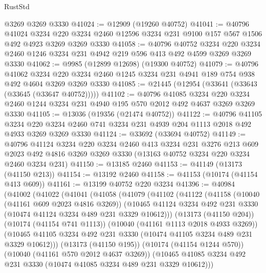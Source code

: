 \begin{lexlean}{RustStd}
\begin{coremodule}
    @3269
    @3269
    @3330
@41024 := @12909 (@19260 @40752)
@41041 := @40796
    @41024
    @3234
    @220
    @3234
    @2460
    @12596
    @3234
    @231
    @9100
    @157
    @567
    @1506
    @492
    @4923
    @3269
    @3269
    @3330
@41058 := @40796
    @40752
    @3234
    @220
    @3234
    @2460
    @1246
    @3234
    @231
    @4942
    @219
    @596
    @413
    @492
    @4599
    @3269
    @3269
    @3330
@41062 := @9985 (@12899 @12698) (@19300 @40752)
@41079 := @40796
    @41062
    @3234
    @220
    @3234
    @2460
    @1245
    @3234
    @231
    @4941
    @189
    @754
    @938
    @492
    @4604
    @3269
    @3269
    @3330
@41085 := @21445 (@12954 (@33641 (@33643 (@33645 (@33647 @40752)))))
@41102 := @40796
    @41085
    @3234
    @220
    @3234
    @2460
    @1244
    @3234
    @231
    @4940
    @195
    @570
    @2012
    @492
    @4637
    @3269
    @3269
    @3330
@41105 := @13036 (@19356 (@21474 @40752))
@41122 := @40796
    @41105
    @3234
    @220
    @3234
    @2460
    @741
    @3234
    @231
    @4939
    @204
    @1113
    @2018
    @492
    @4933
    @3269
    @3269
    @3330
@41124 := @33692 (@33694 @40752)
@41149 := @40796
    @41124
    @3234
    @220
    @3234
    @2460
    @413
    @3234
    @231
    @3276
    @213
    @609
    @2023
    @492
    @4816
    @3269
    @3269
    @3330
    (@13163 @40752 @3234 @220 @3234 @2460 @3234 @231)
@41150 := @13185 @2460
@41153 := @41149 (@13173 (@41150 @213))
@41154 := @13192 @2460
@41158 := @41153 (@10174 (@41154 @413 @609))
@41161 := @13199 @40752 @220 @3234
@41396 := @40984
    (@41002
      (@41022
        (@41041
          (@41058
            (@41079
              (@41102
                (@41122
                  (@41158
                    (@10040 (@41161 @609 @2023 @4816 @3269))
                    (@10465
                      @41124
                      @3234
                      @492
                      @231
                      @3330
                      (@10474 @41124 @3234 @489 @231 @3329 @10612)))
                  (@13173 (@41150 @204))
                  (@10174 (@41154 @741 @1113))
                  (@10040 (@41161 @1113 @2018 @4933 @3269))
                  (@10465
                    @41105
                    @3234
                    @492
                    @231
                    @3330
                    (@10474 @41105 @3234 @489 @231 @3329 @10612)))
                (@13173 (@41150 @195))
                (@10174 (@41154 @1244 @570))
                (@10040 (@41161 @570 @2012 @4637 @3269))
                (@10465 @41085 @3234 @492 @231 @3330 (@10474 @41085 @3234 @489 @231 @3329 @10612)))

\end{coremodule}
\end{lexlean}
